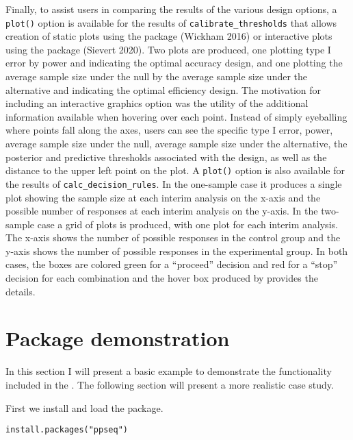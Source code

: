 Finally, to assist users in comparing the results of the various design options, a \texttt{plot()} option is available for the results of \texttt{calibrate\_thresholds} that allows creation of static plots using the  package (Wickham 2016) or interactive plots using the  package (Sievert 2020). Two plots are produced, one plotting type I error by power and indicating the optimal accuracy design, and one plotting the average sample size under the null by the average sample size under the alternative and indicating the optimal efficiency design. The motivation for including an interactive graphics option was the utility of the additional information available when hovering over each point. Instead of simply eyeballing where points fall along the axes, users can see the specific type I error, power, average sample size under the null, average sample size under the alternative, the posterior and predictive thresholds associated with the design, as well as the distance to the upper left point on the plot. A \texttt{plot()} option is also available for the results of \texttt{calc\_decision\_rules}. In the one-sample case it produces a single plot showing the sample size at each interim analysis on the x-axis and the possible number of responses at each interim analysis on the y-axis. In the two-sample case a grid of plots is produced, with one plot for each interim analysis. The x-axis shows the number of possible responses in the control group and the y-axis shows the number of possible responses in the experimental group. In both cases, the boxes are colored green for a ``proceed'' decision and red for a ``stop'' decision for each combination and the hover box produced by  provides the details.

\hypertarget{package-demonstration}{%
\section{Package demonstration}\label{package-demonstration}}

In this section I will present a basic example to demonstrate the functionality included in the . The following section will present a more realistic case study.

First we install and load the  package.

\begin{verbatim}
install.packages("ppseq")
\end{verbatim}


